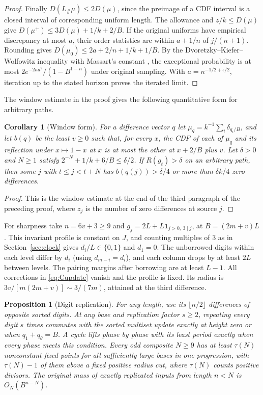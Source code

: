 \documentclass[11pt]{amsart}
\newtheorem{proposition}[theorem]{Proposition}
\newtheorem*{corollary*}{Corollary}
\theoremstyle{definition}
\newcommand{\one}{\mathbf 1}
\begin{document}
\begin{proof}
Finally \(D(L_\#\mu)\le2D(\mu)\), since the preimage of a
CDF interval is a closed interval of corresponding uniform
length. The allowance and \(z/k\le D(\mu)\) give
\(D(\mu^+)\le3D(\mu)+1/k+2/B\).
If the original uniforms have empirical discrepancy at most
\(a\), their order statistics are within \(a+1/n\) of
\(j/(n+1)\). Rounding gives \(D(\mu_0)\le2a+2/n+1/k+1/B\).
By the Dvoretzky--Kiefer--Wolfowitz inequality with Massart's
constant \cite[p.~1269]{Massart}, the exceptional probability
is at most \(2e^{-2na^2}/(1-B^{1-n})\) under original sampling.
With \(a=n^{-1/2+\epsilon/2}\), iteration up to the stated horizon
proves the iterated limit.
\end{proof}

The window estimate in the proof gives the following quantitative form
for arbitrary paths.

\begin{corollary*}[Window form]
For a difference vector \(q\) let \(\mu_q=k^{-1}\sum_i\delta_{q_i/B}\),
and let \(b(q)\) be the least \(v\ge0\) such that, for every \(x\), the
CDF of each of \(\mu_q\) and its reflection under \(x\mapsto1-x\) at
\(x\) is at most the other at \(x+2/B\) plus \(v\). Let \(\delta>0\) and
\(N\ge1\) satisfy \(2^{-N}+1/k+6/B\le\delta/2\). If \(R(g_t)>\delta\) on
an arbitrary path, then some \(j\) with \(t\le j<t+N\) has
\(b(q(j))>\delta/4\) or more than \(\delta k/4\) zero differences.
\end{corollary*}

\begin{proof}
This is the window estimate at the end of the third paragraph of the
preceding proof, where \(z_j\) is the number of zero differences at
source \(j\).
\end{proof}

For sharpness take \(n=6v+3\ge9\) and
\(g_j=2L+L\one_{j>0,\ 3\mid j}\), at \(B=(2m+v)L\).
This invariant profile is constant on \(J\), and counting
multiples of 3 as in Section~\ref{sec:clock} gives
\(d_i/L\in\{0,1\}\) and \(d_1=0\).
The unborrowed digits within each level differ by \(d_i\)
(using \(d_{m-i}=d_i\)), and each column drops by at least
\(2L\) between levels. The pairing margins after borrowing
are at least \(L-1\). All corrections in \eqref{eq:Cupdate}
vanish and the profile is fixed. Its radius is
\(3v/[m(2m+v)]\sim3/(7m)\), attained at the third difference.

\begin{proposition}[Digit replication]\label{prop:replicate}
For any length, use its \(\lfloor n/2\rfloor\) differences
of opposite sorted digits. At any base and replication
factor \(s\ge2\), repeating every digit \(s\) times commutes with the sorted
multiset update exactly at height zero or when \(q_1+q_\theta=B\).
A cycle lifts phase by phase with its least period exactly
when every phase meets this condition. Every odd composite
\(N\ge9\) has at least \(\tau(N)\) nonconstant fixed points
for all sufficiently large bases in one progression, with
\(\tau(N)-1\) of them above a fixed positive radius cut,
where \(\tau(N)\) counts positive divisors.
The original mass of exactly replicated inputs from length
\(n<N\) is \(O_N(B^{n-N})\).
\end{proposition}
\end{document}
